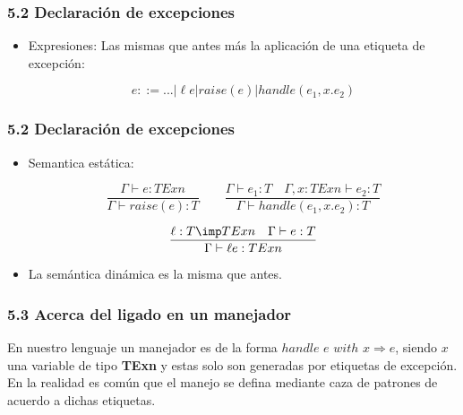 \documentclass[xcolor=dvipsnames,table,spanish]{beamer}
\begin{document}
\begin{frame}
\frametitle{5.2 Declaración de excepciones}
\begin{itemize}
\item Expresiones: Las mismas que antes más la aplicación de una etiqueta de excepción:

\[ e::=...|\ell e|raise(e)|handle(e_1,x.e_2)\]

\end{itemize}
\end{frame}
\begin{frame}
\frametitle{5.2 Declaración de excepciones}
\begin{itemize}
\item Semantica estática:

\[ \frac{\Gamma \vdash e:TExn}{\Gamma \vdash raise(e):T} \qquad \frac{\Gamma \vdash e_1:T \quad \Gamma,x:TExn \vdash e_2:T}{\Gamma \vdash handle(e_1,x.e_2):T}\]

\[ \frac{\ell:T \imp TExn \quad \Gamma \vdash e:T}{\Gamma \vdash \ell e:TExn}\]
\item La semántica dinámica es la misma que antes.
\end{itemize}
\end{frame}
\begin{frame}
\frametitle{5.3 Acerca del ligado en un manejador}
En nuestro lenguaje un manejador es de la forma $handle$ $\mathit{e}$ $with$ $\mathit{x} \Rightarrow \mathit{e}$, siendo $\mathit{x}$ una variable de tipo \textbf{TExn} y estas solo son generadas por etiquetas de excepción. En la realidad es común que el manejo se defina mediante caza de patrones de acuerdo a dichas etiquetas.
\end{frame}
\end{document}
